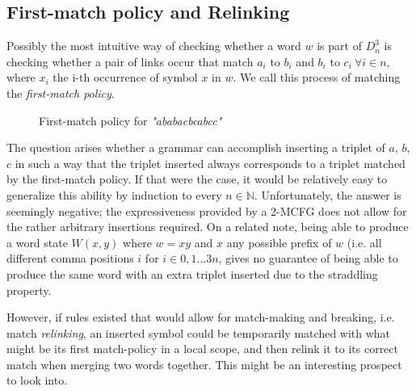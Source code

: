 \documentclass[nonatbib,numbers,10pt]{sigplanconf}
\newcommand{\w}[1]{\textit{"#1"}}
\begin{document}
\subsection{First-match policy and Relinking}
Possibly the most intuitive way of checking whether a word $w$ is part of $D^3_n$ is checking whether a pair of links occur that match $a_i$ to $b_i$ and $b_i$ to $c_i \ \forall i \in n$, where $x_i$ the i-th occurrence of symbol $x$ in $w$. We call this process of matching the \textit{first-match policy}.

\begin{figure}[h!]
\centering
{}
\caption{First-match policy for \w{ababacbcabcc}}
\end{figure}

The question arises whether a grammar can accomplish inserting a triplet of $a$, $b$, $c$ in such a way that the triplet inserted always corresponds to a triplet matched by the first-match policy. If that were the case, it would be relatively easy to generalize this ability by induction to every $n \in \mathbb{N}$. Unfortunately, the answer is seemingly negative; the expressiveness provided by a 2-MCFG does not allow for the rather arbitrary insertions required. On a related note, being able to produce a word state $W(x,y)$ where $w=xy$ and $x$ any possible prefix of $w$ (i.e. all different comma positions $i$ for $i \in 0,1...3n$, gives no guarantee of being able to produce the same word with an extra triplet inserted due to the straddling property.

However, if rules existed that would allow for match-making and breaking, i.e. match \textit{relinking}, an inserted symbol could be temporarily matched with what might be its first match-policy in a local scope, and then relink it to its correct match when merging two words together. This might be an interesting prospect to look into.
\end{document}
